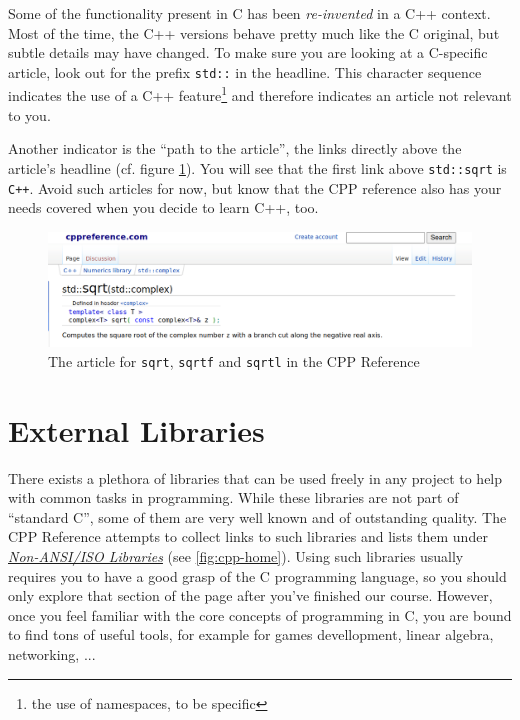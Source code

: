 Some of the functionality present in C has been \emph{re-invented} in a C++ context. Most of the time, the C++ versions behave pretty much like the C original, but subtle details may have changed. To make sure you are looking at a C-specific article, look out for the prefix \texttt{std::} in the headline. This character sequence indicates the use of a C++ feature\footnote{the use of namespaces, to be specific} and therefore indicates an article not relevant to you.

Another indicator is the \enquote{path to the article}, \ie the links directly above the article's headline (cf. figure \ref{fig:cpp-sqrt-cpp}). You will see that the first link above \texttt{std::sqrt} is \texttt{C++}. Avoid such articles for now, but know that the CPP reference also has your needs covered when you decide to learn C++, too.

\begin{figure}
	\includegraphics[width=\linewidth]{./gfx/cpp-sqrt-cpp}
	\caption{The article for \texttt{sqrt}, \texttt{sqrtf} and \texttt{sqrtl} in the CPP Reference} \label{fig:cpp-sqrt-cpp}
\end{figure}


\section{External Libraries}
There exists a plethora of libraries that can be used freely in any project to help with common tasks in programming. While these libraries are not part of \enquote{standard C}, some of them are very well known and of outstanding quality. The CPP Reference attempts to collect links to such libraries and lists them under \href{https://en.cppreference.com/w/c/links/libs}{\emph{Non-ANSI/ISO Libraries}} (see \ref{fig:cpp-home}). Using such libraries usually requires you to have a good grasp of the C programming language, so you should only explore that section of the page after you've finished our course. However, once you feel familiar with the core concepts of programming in C, you are bound to find tons of useful tools, for example for games devellopment, linear algebra, networking, ...




